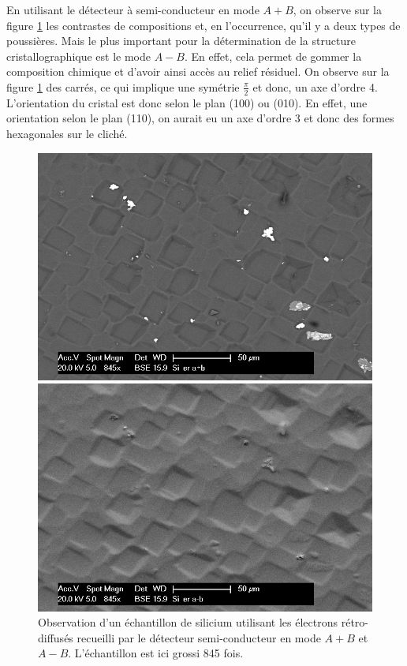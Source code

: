 \documentclass[a4paper,12pt]{article}
\begin{document}
En utilisant le détecteur à semi-conducteur en mode $A+B$, on observe sur la figure \ref{fig:si_er_apb_amb} les contrastes de compositions et, en l'occurrence, qu'il y a deux types de poussières. Mais le plus important pour la détermination de la structure cristallographique est le mode $A-B$. En effet, cela permet de gommer la composition chimique et d'avoir ainsi accès au relief résiduel. On observe sur la figure \ref{fig:si_er_apb_amb} des carrés, ce qui implique une symétrie $\frac{\pi}{2}$ et donc, un axe d'ordre 4. L'orientation du cristal est donc selon le plan (100) ou (010). En effet, une orientation selon le plan (110), on aurait eu un axe d'ordre 3 et donc des formes hexagonales sur le cliché.
\begin{figure}
\begin{minipage}[c]{.5\linewidth}
\centering
\includegraphics[width=1\textwidth]{images/si_er_apb.png}
 \end{minipage}\hfill
\begin{minipage}[c]{.5\linewidth}
\centering
\includegraphics[width=1\textwidth]{images/si_er_amb.png}
\end{minipage}
\caption{Observation d'un échantillon de silicium utilisant les électrons rétro-diffusés recueilli par le détecteur semi-conducteur en mode $A+B$ et $A-B$. L'échantillon est ici grossi 845 fois.}
\label{fig:si_er_apb_amb}
\end{figure}
\end{document}
